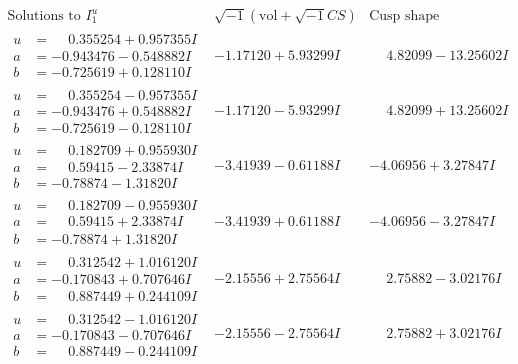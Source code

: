 \documentclass[1p]{elsarticle_modified}
\theoremstyle{definition}
\newcommand{\I}{\sqrt{-1}}
\begin{document}
$$\begin{array}{c|c|c}  
\text{Solutions to }I^u_{1}& \I (\text{vol} + \sqrt{-1}CS) & \text{Cusp shape}\\
 \hline 
\begin{aligned}
u &= \phantom{-}0.355254 + 0.957355 I \\
a &= -0.943476 - 0.548882 I \\
b &= -0.725619 + 0.128110 I\end{aligned}
 & -1.17120 + 5.93299 I & \phantom{-}4.82099 - 13.25602 I \\ \hline\begin{aligned}
u &= \phantom{-}0.355254 - 0.957355 I \\
a &= -0.943476 + 0.548882 I \\
b &= -0.725619 - 0.128110 I\end{aligned}
 & -1.17120 - 5.93299 I & \phantom{-}4.82099 + 13.25602 I \\ \hline\begin{aligned}
u &= \phantom{-}0.182709 + 0.955930 I \\
a &= \phantom{-}0.59415 - 2.33874 I \\
b &= -0.78874 - 1.31820 I\end{aligned}
 & -3.41939 - 0.61188 I & -4.06956 + 3.27847 I \\ \hline\begin{aligned}
u &= \phantom{-}0.182709 - 0.955930 I \\
a &= \phantom{-}0.59415 + 2.33874 I \\
b &= -0.78874 + 1.31820 I\end{aligned}
 & -3.41939 + 0.61188 I & -4.06956 - 3.27847 I \\ \hline\begin{aligned}
u &= \phantom{-}0.312542 + 1.016120 I \\
a &= -0.170843 + 0.707646 I \\
b &= \phantom{-}0.887449 + 0.244109 I\end{aligned}
 & -2.15556 + 2.75564 I & \phantom{-}2.75882 - 3.02176 I \\ \hline\begin{aligned}
u &= \phantom{-}0.312542 - 1.016120 I \\
a &= -0.170843 - 0.707646 I \\
b &= \phantom{-}0.887449 - 0.244109 I\end{aligned}
 & -2.15556 - 2.75564 I & \phantom{-}2.75882 + 3.02176 I \\ \hline\begin{aligned}

\end{aligned}
\end{array}$$
\end{document}
